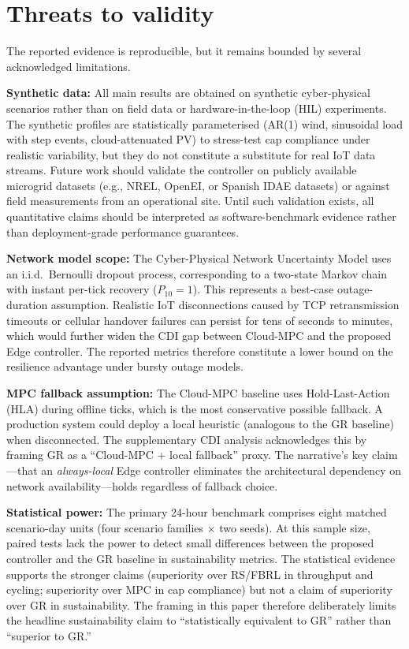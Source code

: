 \documentclass[preprint,12pt]{elsarticle}
\begin{document}
\FloatBarrier
\section{Threats to validity}
The reported evidence is reproducible, but it remains bounded by several acknowledged limitations.

\textbf{Synthetic data:} All main results are obtained on synthetic cyber-physical scenarios rather than on field data or hardware-in-the-loop (HIL) experiments. The synthetic profiles are statistically parameterised (AR(1) wind, sinusoidal load with step events, cloud-attenuated PV) to stress-test cap compliance under realistic variability, but they do not constitute a substitute for real IoT data streams. Future work should validate the controller on publicly available microgrid datasets (e.g., NREL, OpenEI, or Spanish IDAE datasets) or against field measurements from an operational site. Until such validation exists, all quantitative claims should be interpreted as software-benchmark evidence rather than deployment-grade performance guarantees.

\textbf{Network model scope:} The Cyber-Physical Network Uncertainty Model uses an i.i.d.\ Bernoulli dropout process, corresponding to a two-state Markov chain with instant per-tick recovery ($P_{10}=1$). This represents a best-case outage-duration assumption. Realistic IoT disconnections caused by TCP retransmission timeouts or cellular handover failures can persist for tens of seconds to minutes, which would further widen the CDI gap between Cloud-MPC and the proposed Edge controller. The reported metrics therefore constitute a lower bound on the resilience advantage under bursty outage models.

\textbf{MPC fallback assumption:} The Cloud-MPC baseline uses Hold-Last-Action (HLA) during offline ticks, which is the most conservative possible fallback. A production system could deploy a local heuristic (analogous to the GR baseline) when disconnected. The supplementary CDI analysis acknowledges this by framing GR as a ``Cloud-MPC + local fallback'' proxy. The narrative's key claim---that an \emph{always-local} Edge controller eliminates the architectural dependency on network availability---holds regardless of fallback choice.

\textbf{Statistical power:} The primary 24-hour benchmark comprises eight matched scenario-day units (four scenario families × two seeds). At this sample size, paired tests lack the power to detect small differences between the proposed controller and the GR baseline in sustainability metrics. The statistical evidence supports the stronger claims (superiority over RS/FBRL in throughput and cycling; superiority over MPC in cap compliance) but not a claim of superiority over GR in sustainability. The framing in this paper therefore deliberately limits the headline sustainability claim to ``statistically equivalent to GR'' rather than ``superior to GR.''
\end{document}

